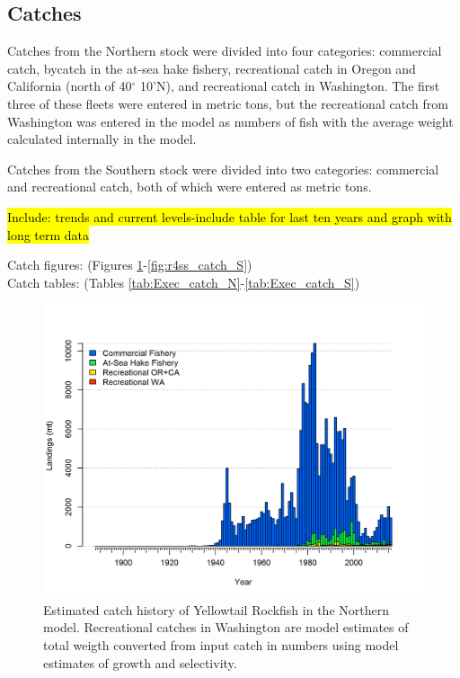 \documentclass[12pt,]{article}
\begin{document}
\subsection*{Catches}\label{catches}

Catches from the Northern stock were divided into four categories:
commercial catch, bycatch in the at-sea hake fishery, recreational catch
in Oregon and California (north of 40\(^\circ\) 10'N), and recreational
catch in Washington. The first three of these fleets were entered in
metric tons, but the recreational catch from Washington was entered in
the model as numbers of fish with the average weight calculated
internally in the model.

Catches from the Southern stock were divided into two categories:
commercial and recreational catch, both of which were entered as metric
tons.

\hl{Include: trends and current levels-include table for last ten years and graph with 
long term data}

Catch figures: (Figures \ref{fig:r4ss_catch_N}-\ref{fig:r4ss_catch_S})\\
Catch tables: (Tables \ref{tab:Exec_catch_N}-\ref{tab:Exec_catch_S})

\FloatBarrier

\FloatBarrier

\begin{figure}[htbp]
\centering
\includegraphics{r4ss/plots_mod1/catch2 landings stacked.png}
\caption{Estimated catch history of Yellowtail Rockfish in the Northern
model. Recreational catches in Washington are model estimates of total
weigth converted from input catch in numbers using model estimates of
growth and selectivity.\label{fig:r4ss_catch_N}}
\end{figure}
\end{document}

